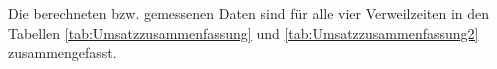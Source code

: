 \documentclass[12pt,liststotoc]{report}
\begin{document}
%
%
%
Die berechneten bzw. gemessenen Daten sind für alle vier Verweilzeiten in den Tabellen \ref{tab:Umsatzzusammenfassung} und \ref{tab:Umsatzzusammenfassung2} zusammengefasst.
\end{document}
